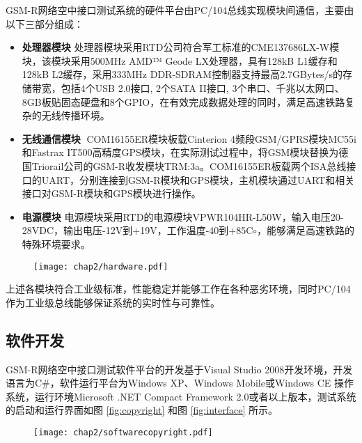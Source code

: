GSM-R网络空中接口测试系统的硬件平台由PC/104总线实现模块间通信，主要由以下三部分组成：
\begin{itemize}
  \item \textbf{处理器模块}
  处理器模块采用RTD公司符合军工标准的CME137686LX-W模块，该模块采用500MHz AMD™ Geode LX处理器，具有128kB L1缓存和128kB L2缓存，采用333MHz DDR-SDRAM控制器支持最高2.7GBytes/s的存储带宽，包括4个USB 2.0接口, 2个SATA II接口, 3个串口、千兆以太网口、8GB板贴固态硬盘和8个GPIO，在有效完成数据处理的同时，满足高速铁路复杂的无线传播环境。
  \item \textbf{无线通信模块}
  COM16155ER模块板载Cinterion 4频段GSM/GPRS模块MC55i和Fastrax IT500高精度GPS模块，在实际测试过程中，将GSM模块替换为德国Triorail公司的GSM-R收发模块TRM:3a。COM16155ER板载两个ISA总线接口的UART，分别连接到GSM-R模块和GPS模块，主机模块通过UART和相关接口对GSM-R模块和GPS模块进行操作。
  \item\textbf{电源模块}
  电源模块采用RTD的电源模块VPWR104HR-L50W，输入电压20-28VDC，输出电压-12V到+19V，工作温度-40到+85C$\circ$，能够满足高速铁路的特殊环境要求。
\end{itemize}

\begin{figure}[!htp]
\centering
    \texttt{[image: chap2/hardware.pdf]}
\end{figure}

上述各模块符合工业级标准，性能稳定并能够工作在各种恶劣环境，同时PC/104作为工业级总线能够保证系统的实时性与可靠性。

\subsection{软件开发}
\label{sec:softwaregsmmr}

GSM-R网络空中接口测试软件平台的开发基于Visual Studio 2008开发环境，开发语言为C\#，软件运行平台为Windows XP、Windows Mobile或Windows CE 操作系统，运行环境Microsoft .NET Compact Framework 2.0或者以上版本，测试系统的启动和运行界面如图 \ref{fig:copyright} 和图 \ref{fig:interface} 所示。

\begin{figure}[!htp]
\centering
    \texttt{[image: chap2/softwarecopyright.pdf]}
\end{figure}


